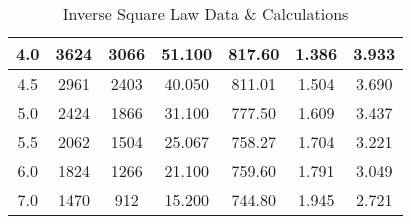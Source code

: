 \begin{table}[h]
{\begin{tabular}{|c|c|c|c|c|c|c|}
			4.0                                                                  & 3624           & 3066                                                                      & 51.100                                                                                & 817.60                                                              & 1.386              & 3.933              \\ \hline
			4.5                                                                  & 2961           & 2403                                                                      & 40.050                                                                                & 811.01                                                              & 1.504              & 3.690              \\ \hline
			5.0                                                                  & 2424           & 1866                                                                      & 31.100                                                                                & 777.50                                                              & 1.609              & 3.437              \\ \hline
			5.5                                                                  & 2062           & 1504                                                                      & 25.067                                                                                & 758.27                                                              & 1.704              & 3.221              \\ \hline
			6.0                                                                  & 1824           & 1266                                                                      & 21.100                                                                                & 759.60                                                              & 1.791              & 3.049              \\ \hline
			7.0                                                                  & 1470           & 912                                                                       & 15.200                                                                                & 744.80                                                              & 1.945              & 2.721              \\ \hline
		\end{tabular}%
	}
	\caption{Inverse Square Law Data \& Calculations}
	\label{tab:3}
\end{table}